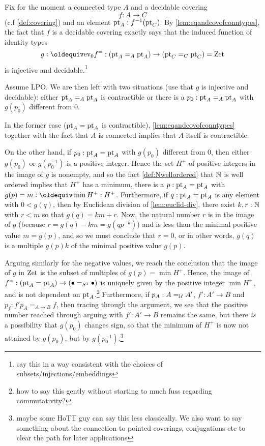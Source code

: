 Fix for the moment a connected type $A$ and a decidable covering 
$$f:A\to C$$ (c.f \cref{def:covering}) and an element ${\mathord{\mathrm{pt}}}_A:f^{-1}({\mathord{\mathrm{pt}}}_C)$.  %
By \cref{lem:eqandcovofconntypes}, the fact that $f$ is a decidable covering exactly says that the induced function of identity types
$$g\defequi\ev_0f^=:(\pt_A=_A\pt_A)\to (\pt_C=_C\pt_C)=\zet$$ is injective and decidable.\footnote{say this in a way consistent with the choices of subsets/injections/embeddings}    

Assume LPO.  We are then left with two situations (use that $g$ is injective and decidable): either ${\mathord{\mathrm{pt}}}_A=_A{\mathord{\mathrm{pt}}}_A$ is contractible or there is a $p_0:{\mathord{\mathrm{pt}}}_A=_A{\mathord{\mathrm{pt}}}_A$ with $g(p_0)$ different from $0$. 

In the former case (${\mathord{\mathrm{pt}}}_A={\mathord{\mathrm{pt}}}_A$ is contractible), \cref{lem:eqandcovofconntypes} together with the fact that $A$ is connected implies that $A$ itself is contractible.  

On the other hand, if $p_0:{\mathord{\mathrm{pt}}}_A={\mathord{\mathrm{pt}}}_A$ with $g(p_0)$ different from $0$, then either $g(p_0)$ or $g(p_0^{-1})$ is a positive integer.  Hence the set $H^+$ of positive integers in the image of $g$ is nonempty, and so the fact \cref{def:Nwellordered} that $\mathbb{N}$ is well ordered implies that $H^+$ has a minimum, \ie there is a $p:{\mathord{\mathrm{pt}}}_A={\mathord{\mathrm{pt}}}_A$ with  $g(p)=m\defequi\min H^+:H^+$.  Furthermore, if $q:{\mathord{\mathrm{pt}}}_A={\mathord{\mathrm{pt}}}_A$ is any element with $0<g(q)$, then  by Euclidean division of \cref{lem:euclid-div}, there exist $k,r:\mathbb{N}$ with $r<m$ so that $g(q)=km+r$.  Now, the natural number $r$ is in the image of $g$ (because $r=g(q)-km=g(qp^{-k})$) and is less than the minimal positive value $m=g(p)$, and so we must conclude that $r=0$, or in other words, $g(q)$ is a multiple $g(p)k$ of the minimal positive value $g(p)$.


Arguing similarly for the negative values, we reach the conclusion that the image of $g$ in $\mathrm{Zet}$ is the subset of multiples of $g(p)=\min H^+$.  Hence, the image of $f^=:({\mathord{\mathrm{pt}}}_A={\mathord{\mathrm{pt}}}_A)\to(\bullet=_{S^1}\bullet)$ is uniquely given by the positive integer $\min H^+$, and is not dependent on ${\mathord{\mathrm{pt}}}_A$.\footnote{how to say this gently without starting to much fuss regarding commutativity?}  Furthermore, if $p_A:A=_{\mathcal{U}}A'$, $f':A'\to B$ and $p_f:f'p_A=_{A\to B}f$, then tracing through the argument, we see that the positive number reached through arguing with $f':A'\to B$ remains the same, but there \emph{is} a possibility that $g(p_0)$ changes sign, so that the minimum of $H^+$ is now not attained by $g(p_0)$, but by $g(p_0^{-1})$.\footnote{maybe some HoTT guy can say this less classically.  We also want to say something about the connection to pointed coverings, conjugations etc to clear the path for later applications}

